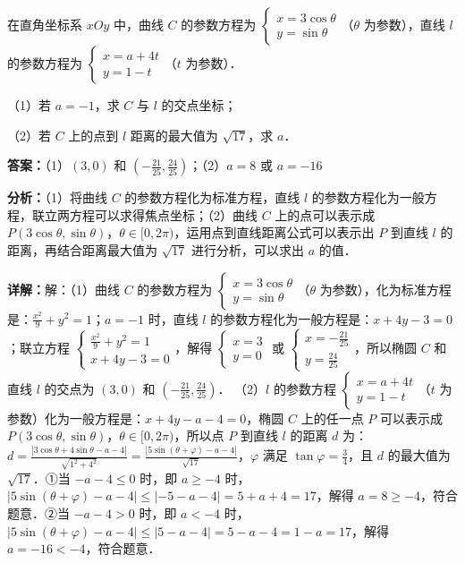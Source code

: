 \begin{question}[points=10]
[选修 4-4，坐标系与参数方程]

在直角坐标系 $xOy$ 中，曲线 $C$ 的参数方程为 $\begin{cases} x=3\cos\theta \\ y=\sin\theta \end{cases}$（$\theta$ 为参数），直线 $l$ 的参数方程为 $\begin{cases} x=a+4t \\ y=1-t \end{cases}$（$t$ 为参数）．

（1）若 $a=-1$，求 $C$ 与 $l$ 的交点坐标；

（2）若 $C$ 上的点到 $l$ 距离的最大值为 $\sqrt{17}$，求 $a$．
\begin{solution}
\textbf{答案：}（1）$(3,0)$ 和 $(-\frac{21}{25},\frac{24}{25})$；（2）$a=8$ 或 $a=-16$

\textbf{分析：}（1）将曲线 $C$ 的参数方程化为标准方程，直线 $l$ 的参数方程化为一般方程，联立两方程可以求得焦点坐标；（2）曲线 $C$ 上的点可以表示成 $P(3\cos\theta,\sin\theta)$，$\theta\in[0,2\pi)$，运用点到直线距离公式可以表示出 $P$ 到直线 $l$ 的距离，再结合距离最大值为 $\sqrt{17}$ 进行分析，可以求出 $a$ 的值．

\textbf{详解：}解：（1）曲线 $C$ 的参数方程为 $\begin{cases} x=3\cos\theta \\ y=\sin\theta \end{cases}$（$\theta$ 为参数），化为标准方程是：$\frac{x^2}{9}+y^2=1$；$a=-1$ 时，直线 $l$ 的参数方程化为一般方程是：$x+4y-3=0$；联立方程 $\begin{cases} \frac{x^2}{9}+y^2=1 \\ x+4y-3=0 \end{cases}$，解得 $\begin{cases} x=3 \\ y=0 \end{cases}$ 或 $\begin{cases} x=-\frac{21}{25} \\ y=\frac{24}{25} \end{cases}$，所以椭圆 $C$ 和直线 $l$ 的交点为 $(3,0)$ 和 $(-\frac{21}{25},\frac{24}{25})$．
（2）$l$ 的参数方程 $\begin{cases} x=a+4t \\ y=1-t \end{cases}$（$t$ 为参数）化为一般方程是：$x+4y-a-4=0$，椭圆 $C$ 上的任一点 $P$ 可以表示成 $P(3\cos\theta,\sin\theta)$，$\theta\in[0,2\pi)$，所以点 $P$ 到直线 $l$ 的距离 $d$ 为：$d=\frac{|3\cos\theta+4\sin\theta-a-4|}{\sqrt{1^2+4^2}}=\frac{|5\sin(\theta+\varphi)-a-4|}{\sqrt{17}}$，$\varphi$ 满足 $\tan\varphi=\frac{3}{4}$，且 $d$ 的最大值为 $\sqrt{17}$．①当 $-a-4\leq0$ 时，即 $a\geq-4$ 时，$|5\sin(\theta+\varphi)-a-4|\leq| -5-a-4|=5+a+4=17$，解得 $a=8\geq-4$，符合题意．②当 $-a-4>0$ 时，即 $a<-4$ 时，$|5\sin(\theta+\varphi)-a-4|\leq|5-a-4|=5-a-4=1-a=17$，解得 $a=-16<-4$，符合题意．
\end{solution}
\end{question}

